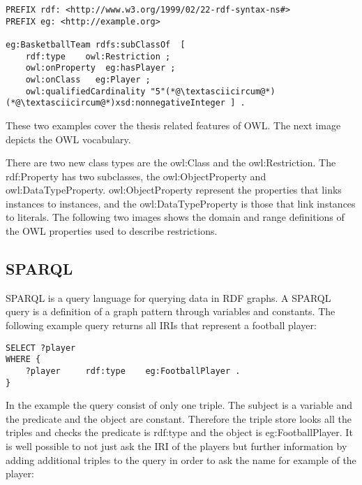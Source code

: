 \begin{lstlisting}[captionpos=b, caption=OWL restriction in N3 format, label=lst:sparql,
basicstyle=\footnotesize,frame=single]
PREFIX rdf: <http://www.w3.org/1999/02/22-rdf-syntax-ns#>
PREFIX eg: <http://example.org> 

eg:BasketballTeam rdfs:subClassOf  [
	rdf:type	owl:Restriction ; 
	owl:onProperty	eg:hasPlayer ; 
	owl:onClass	  eg:Player ; 
	owl:qualifiedCardinality "5"(*@\textasciicircum@*)(*@\textasciicircum@*)xsd:nonnegativeInteger ] . 

\end{lstlisting}



These two examples cover the thesis related features of OWL. The next image depicts the OWL vocabulary. 



There are two new class types are the owl:Class and the owl:Restriction. The rdf:Property has two subclasses, the owl:ObjectProperty and owl:DataTypeProperty. owl:ObjectProperty represent the properties that links instances to instances, and the owl:DataTypeProperty is those that link instances to literals. The following two images shows the domain and range definitions of the OWL properties used to describe restrictions.


\subsection{SPARQL}

SPARQL is a query language for querying data in RDF graphs. A SPARQL query is a definition of a graph pattern through variables and constants. The following example query returns all IRIs that represent a football player: 

\begin{lstlisting}[captionpos=b, caption=SPARQL Query I., label=lst:sparql,
basicstyle=\footnotesize,frame=single]
SELECT ?player  
WHERE { 
	?player		rdf:type	eg:FootballPlayer .	
}
\end{lstlisting}

In the example the query consist of only one triple. The subject is a variable and the predicate and the object are constant. Therefore the triple store looks all the triples and checks the predicate is rdf:type and the object is eg:FootballPlayer. 
It is well possible to not just ask the IRI of the players but further information by adding additional triples to the query in order to ask the name for example of the player:

